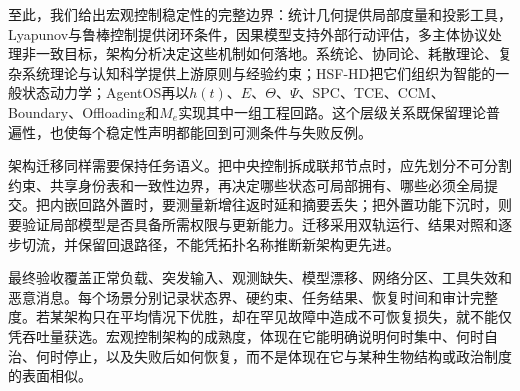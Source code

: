 至此，我们给出宏观控制稳定性的完整边界：统计几何提供局部度量和投影工具，Lyapunov与鲁棒控制提供闭环条件，因果模型支持外部行动评估，多主体协议处理非一致目标，架构分析决定这些机制如何落地。系统论、协同论、耗散理论、复杂系统理论与认知科学提供上游原则与经验约束；HSF-HD把它们组织为智能的一般状态动力学；AgentOS再以$h(t)$、$E$、$\Theta$、$\Psi$、SPC、TCE、CCM、Boundary、Offloading和$M_e$实现其中一组工程回路。这个层级关系既保留理论普遍性，也使每个稳定性声明都能回到可测条件与失败反例。

架构迁移同样需要保持任务语义。把中央控制拆成联邦节点时，应先划分不可分割约束、共享身份表和一致性边界，再决定哪些状态可局部拥有、哪些必须全局提交。把内嵌回路外置时，要测量新增往返时延和摘要丢失；把外置功能下沉时，则要验证局部模型是否具备所需权限与更新能力。迁移采用双轨运行、结果对照和逐步切流，并保留回退路径，不能凭拓扑名称推断新架构更先进。

最终验收覆盖正常负载、突发输入、观测缺失、模型漂移、网络分区、工具失效和恶意消息。每个场景分别记录状态界、硬约束、任务结果、恢复时间和审计完整度。若某架构只在平均情况下优胜，却在罕见故障中造成不可恢复损失，就不能仅凭吞吐量获选。宏观控制架构的成熟度，体现在它能明确说明何时集中、何时自治、何时停止，以及失败后如何恢复，而不是体现在它与某种生物结构或政治制度的表面相似。

